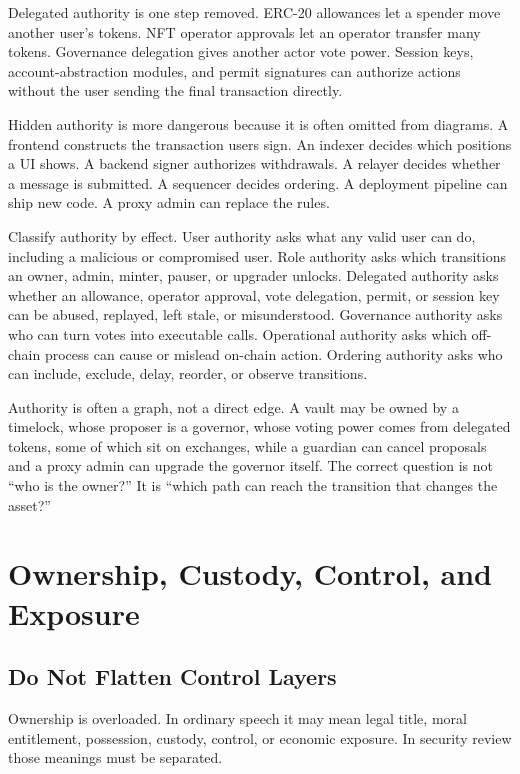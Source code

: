 Delegated authority is one step removed. ERC-20 allowances let a spender move another user's tokens. NFT operator approvals let an operator transfer many tokens. Governance delegation gives another actor vote power. Session keys, account-abstraction modules, and permit signatures can authorize actions without the user sending the final transaction directly.

Hidden authority is more dangerous because it is often omitted from diagrams. A frontend constructs the transaction users sign. An indexer decides which positions a UI shows. A backend signer authorizes withdrawals. A relayer decides whether a message is submitted. A sequencer decides ordering. A deployment pipeline can ship new code. A proxy admin can replace the rules.

Classify authority by effect. User authority asks what any valid user can do, including a malicious or compromised user. Role authority asks which transitions an owner, admin, minter, pauser, or upgrader unlocks. Delegated authority asks whether an allowance, operator approval, vote delegation, permit, or session key can be abused, replayed, left stale, or misunderstood. Governance authority asks who can turn votes into executable calls. Operational authority asks which off-chain process can cause or mislead on-chain action. Ordering authority asks who can include, exclude, delay, reorder, or observe transitions.

Authority is often a graph, not a direct edge. A vault may be owned by a timelock, whose proposer is a governor, whose voting power comes from delegated tokens, some of which sit on exchanges, while a guardian can cancel proposals and a proxy admin can upgrade the governor itself. The correct question is not ``who is the owner?'' It is ``which path can reach the transition that changes the asset?''

\section{Ownership, Custody, Control, and Exposure}

\subsection{Do Not Flatten Control Layers}

Ownership is overloaded. In ordinary speech it may mean legal title, moral entitlement, possession, custody, control, or economic exposure. In security review those meanings must be separated.


